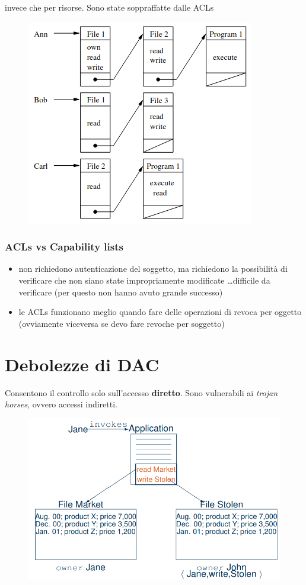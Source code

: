 \documentclass{report}
\begin{document}
\begin{itemize}
    invece che per risorse. Sono state soppraffatte dalle ACLs
    \begin{figure}[H]
        \centering
        \includegraphics[width=0.5\linewidth]{images/capability.png}
    \end{figure}
\end{itemize}

\subsubsection{ACLs vs Capability lists}
\begin{itemize}
    \item non richiedono 
    autenticazione del soggetto, ma richiedono la possibilità di verificare che non siano state impropriamente 
    modificate \dots difficile da verificare (per questo non hanno avuto grande successo)
    \item le ACLs funzionano meglio quando fare delle operazioni di revoca per oggetto (ovviamente viceversa se devo fare revoche per soggetto)
\end{itemize}

\section{Debolezze di DAC}
Consentono il controllo solo sull'accesso \textbf{diretto}. Sono vulnerabili ai \textit{trojan 
horses}, ovvero accessi indiretti.

\begin{figure}[H]
    \centering
    \includegraphics[width=0.8\linewidth]{images/trojan.png}
\end{figure}
\end{document}

